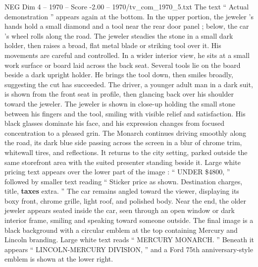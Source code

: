 \begin{textsample}{NEG Dim 4 – 1970 – Score -2.00 – 1970/tv\_com\_1970\_5.txt}
The text “ Actual demonstration ” appears again at the bottom.
In the upper portion, the jeweler ’s hands hold a small diamond and a tool near the rear door panel ; below, the car ’s wheel rolls along the road.
The jeweler steadies the stone in a small dark holder, then raises a broad, flat metal blade or striking tool over it.
His movements are careful and controlled.
In a wider interior view, he sits at a small work surface or board laid across the back seat.
Several tools lie on the board beside a dark upright holder.
He brings the tool down, then smiles broadly, suggesting the cut has succeeded.
The driver, a younger adult man in a dark suit, is shown from the front seat in profile, then glancing back over his shoulder toward the jeweler.
The jeweler is shown in close-up holding the small stone between his fingers and the tool, smiling with visible relief and satisfaction.
His black glasses dominate his face, and his expression changes from focused concentration to a pleased grin.
The Monarch continues driving smoothly along the road, its dark blue side passing across the screen in a blur of chrome trim, whitewall tires, and reflections.
It returns to the city setting, parked outside the same storefront area with the suited presenter standing beside it.
Large white pricing text appears over the lower part of the image : “ UNDER \$4800, ” followed by smaller text reading “ Sticker price as shown.
Destination charges, title, \textbf{taxes} extra. ” The car remains angled toward the viewer, displaying its boxy front, chrome grille, light roof, and polished body.
Near the end, the older jeweler appears seated inside the car, seen through an open window or dark interior frame, smiling and speaking toward someone outside.
The final image is a black background with a circular emblem at the top containing Mercury and Lincoln branding.
Large white text reads “ MERCURY MONARCH. ” Beneath it appears “ LINCOLN-MERCURY DIVISION, ” and a Ford 75th anniversary-style emblem is shown at the lower right.

\end{textsample}
